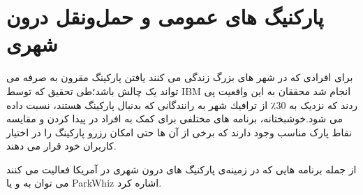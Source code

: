 \section{پارکنیگ های عمومی و حمل‌و‌نقل درون شهری}
برای افرادی که در شهر های بزرگ زندگی می کنند یافتن پارکینگ مقرون به صرفه می تواند یک چالش باشد؛طی تحقیق که توسط IBM انجام شد محققان به این واقعیت پی ردند که نزدیک به  30٪ از ترافیك شهر به رانندگانی كه بدنبال پارکینگ هستند، نسبت داده می شود.خوشبختانه، برنامه های مختلفی برای کمک به افراد در پیدا کردن و مقایسه نقاط پارک مناسب وجود دارند که برخی از آن ها حتی امکان رزرو پارکینگ را در اختیار کاربران خود قرار می دهند.

از جمله برنامه هایی که در زمینه‌ی پارکنیگ های درون شهری در آمریکا فعالیت می کنند می توان به  و یا ParkWhiz اشاره کرد.




















